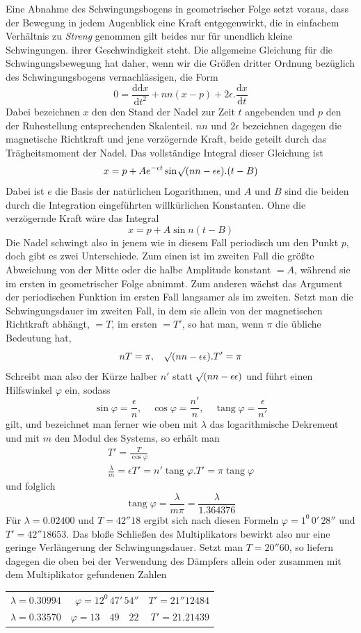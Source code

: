 Eine Abnahme des Schwingungsbogens in geometrischer Folge setzt voraus, dass der Bewegung in jedem Augenblick eine Kraft entgegenwirkt, die in einfachem Verhältnis zu
\expandafter\def\csname HistoricalNoteText395\endcsname{\textit{Streng} genommen gilt beides nur für unendlich kleine Schwingungen.}%
ihrer Geschwindigkeit steht. Die allgemeine Gleichung für die Schwingungsbewegung hat daher, wenn wir die Größen dritter Ordnung bezüglich des Schwingungsbogens vernachlässigen, die Form
\[
0=\frac{\mathrm{d}\mathrm{d}x}{\mathrm{d}t^2}+nn(x-p)+2\epsilon.\frac{\mathrm{d}x}{\mathrm{d}t}
\]
Dabei bezeichnen $x$ den den Stand der Nadel zur Zeit $t$ angebenden und $p$ den der Ruhestellung entsprechenden Skalenteil. $nn$ und $2\epsilon$ bezeichnen dagegen die magnetische Richtkraft und jene verzögernde Kraft, beide geteilt durch das Trägheitsmoment der Nadel. Das vollständige Integral dieser Gleichung ist
\[
x=p+Ae^{-\epsilon t}\sin\mathord{{}^{}\!\surd}(nn-\epsilon\epsilon).(t-B)
\]
Dabei ist $e$ die Basis der natürlichen Logarithmen, und $A$ und $B$ sind die beiden durch die Integration eingeführten willkürlichen Konstanten. Ohne die verzögernde Kraft wäre das Integral
\[
x=p+A\sin n(t-B)
\]
Die Nadel schwingt also in jenem wie in diesem Fall periodisch um den Punkt $p$, doch gibt es zwei Unterschiede. Zum einen ist im zweiten Fall die größte Abweichung von der Mitte oder die halbe Amplitude konstant $=A$, während sie im ersten in geometrischer Folge abnimmt. Zum anderen wächst das Argument der periodischen Funktion im ersten Fall langsamer als im zweiten. Setzt man die Schwingungsdauer im zweiten Fall, in dem sie allein von der magnetischen Richtkraft abhängt, $=T$, im ersten $=T'$, so hat man, wenn $\pi$ die übliche Bedeutung hat,
\[
nT=\pi,\quad \mathord{{}^{}\!\surd}(nn-\epsilon\epsilon).T'=\pi
\]
Schreibt man also der Kürze halber $n'$ statt $\mathord{{}^{}\!\surd}(nn-\epsilon\epsilon)$ und führt einen Hilfswinkel $\varphi$ ein, sodass
\[
\sin\varphi=\frac{\epsilon}{n},\quad \cos\varphi=\frac{n'}{n},\quad \operatorname{tang}\varphi=\frac{\epsilon}{n'}
\]
gilt, und bezeichnet man ferner wie oben mit $\lambda$ das logarithmische Dekrement und mit
$m$ den Modul des Systems, so erhält man
\[
\begin{gathered}
T'=\frac{T}{\cos\varphi}\\
\frac{\lambda}{m}=\epsilon T'=n'\operatorname{tang}\varphi.T'=\pi\operatorname{tang}\varphi
\end{gathered}
\]
und folglich
\[
\operatorname{tang}\varphi=\frac{\lambda}{m\pi}=\frac{\lambda}{1.364376}
\]
Für $\lambda=0.02400$ und $T=42''18$ ergibt sich nach diesen Formeln $\varphi=1^0\,0'\,28''$ und $T'=42''18653$. Das bloße Schließen des Multiplikators bewirkt also nur eine geringe Verlängerung der Schwingungsdauer. Setzt man $T=20''60$, so liefern dagegen die oben bei der Verwendung des Dämpfers allein oder zusammen mit dem Multiplikator gefundenen Zahlen
\begin{center}
\begin{tabular}{r|r|r}
$\lambda=0.30994$&$\varphi=12^0\,47'\,54''$&$T'=21''12484$\\
$\lambda=0.33570$&$\varphi=13\quad49\quad22$&$T'=21.21439$
\end{tabular}
\end{center}

